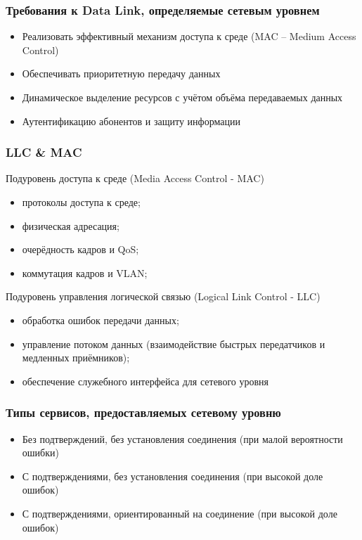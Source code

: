\documentclass[utf8]{beamer}
\begin{document}
\begin{frame}
\frametitle{Требования к Data Link, определяемые сетевым уровнем}
\begin{itemize}
	\item Реализовать эффективный механизм доступа к среде (MAC -- Medium Access Control)
	\item Обеспечивать приоритетную передачу данных
	\item Динамическое выделение ресурсов с учётом объёма передаваемых данных
	\item Аутентификацию абонентов и защиту информации
\end{itemize}
\end{frame}
\begin{frame}
\frametitle{LLC \& MAC}
\begin{block}{Подуровень доступа к среде (Media Access Control - MAC)}
\begin{itemize}
	\item протоколы доступа к среде;
	\item физическая адресация;
	\item очерёдность кадров и QoS;
	\item коммутация кадров и VLAN;
\end{itemize}
\end{block}
\begin{block}{Подуровень управления логической связью (Logical Link Control - LLC)}
\begin{itemize}
	\item обработка ошибок передачи данных;
	\item управление потоком данных (взаимодействие быстрых передатчиков и медленных приёмников);
	\item обеспечение служебного интерфейса для сетевого уровня
\end{itemize}
\end{block}
\end{frame}
\begin{frame}
\frametitle{Типы сервисов, предоставляемых сетевому уровню}
\begin{itemize}
	\item Без подтверждений, без установления соединения (при малой вероятности ошибки)
	\item С подтверждениями, без установления соединения (при высокой доле ошибок)
	\item С подтверждениями, ориентированный на соединение (при высокой доле ошибок)
\end{itemize}
\end{frame}
\end{document}
